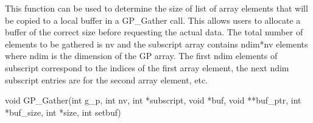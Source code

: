 \documentclass[12pt]{article}
\begin{document}
\ncoll

\begin{desc}

This function can be used to determine the size of list of array elements that
will be copied to a local buffer in a GP\_Gather call. This allows users to
allocate a buffer of the correct size before requesting the actual data. The
total number of elements to be gathered is nv and the
subscript array contains ndim*nv elements where ndim is the dimension of the GP
array. The first ndim elements of subscript correspond to the indices of the first
array element, the next ndim subscript entries are for the second array element,
etc.

\end{desc}



\begin{capi}
\begin{ccode}
void GP_Gather(int g_p, int nv, int *subscript, void *buf,
               void **buf_ptr, int *buf_size, int *size, int setbuf)
\end{ccode}
\begin{funcargs}
\end{funcargs}
\end{capi}

\ncoll
\end{document}
